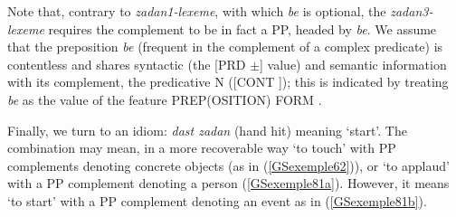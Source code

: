 \documentclass[output=paper
                ,modfonts
                ,nonflat
	        ,collection
	        ,collectionchapter
	        ,collectiontoclongg
 	        ,biblatex
                ,babelshorthands
                ,newtxmath
                ,draftmode
                ,colorlinks, citecolor=brown
]{./langsci/langscibook}
\begin{document}
{\begin{exe}
\end{exe}

Note that, contrary to \textit{zadan1-lexeme}, with which \textit{be} is optional, the \textit{zadan3-lexeme} requires the complement to be in fact a PP, headed by \textit{be}. We assume that the preposition \textit{be} (frequent in the complement of a complex predicate) is contentless and shares syntactic (the [PRD $\pm$] value) and semantic information with its complement, the predicative N ([CONT ]); this is indicated by treating \textit{be} as the value of the feature PREP(OSITION) FORM \citep[Chapter~3]{pollard1987information}.  

Finally, we turn to an idiom: \textit{dast zadan} (hand hit) meaning `start'. The combination may mean, in a more recoverable way `to touch' with PP complements denoting concrete objects (as in (\ref{GSexemple62})), or `to applaud' with a PP complement denoting a person (\ref{GSexemple81a}). However, it means `to start' with a PP complement denoting an event as in (\ref{GSexemple81b}).

\begin{exe}
	\ex \label{GSexemple81} 
	\begin{xlist}
        \label{GSexemple81a}
		

\end{xlist}
\end{exe}}
\end{document}
